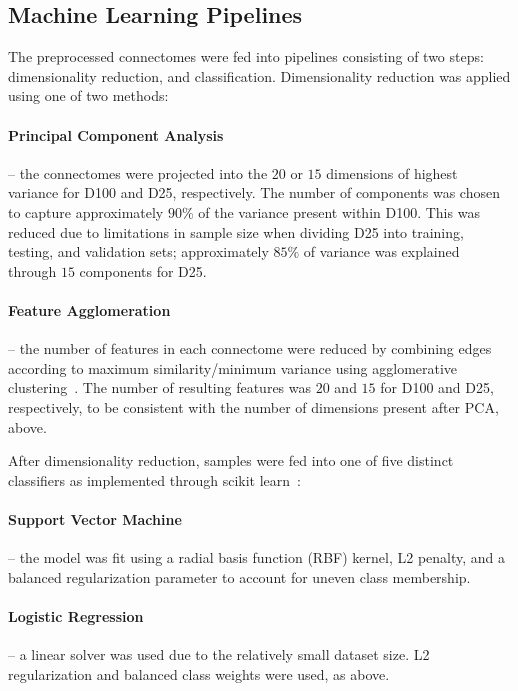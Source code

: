 \documentclass[10pt]{SelfArx} %
\begin{document}
\subsection*{Machine Learning Pipelines}

The preprocessed connectomes were fed into pipelines consisting of two steps: dimensionality reduction, and
classification. Dimensionality reduction was applied using one of two methods:

\paragraph{Principal Component Analysis} – the connectomes were projected into the $20$ or $15$ dimensions of highest
variance for D100 and D25, respectively. The number of components was chosen to capture approximately $90\%$ of the
variance present within D100. This was reduced due to limitations in sample size when dividing D25 into training,
testing, and validation sets; approximately $85\%$ of variance was explained through $15$ components for D25.

\paragraph{Feature Agglomeration} – the number of features in each connectome were reduced by combining edges according
to maximum similarity/minimum variance using agglomerative clustering~\cite{Ward1963-uh}. The number of resulting
features was $20$ and $15$ for D100 and D25, respectively, to be consistent with the number of dimensions present after
PCA, above.

After dimensionality reduction, samples were fed into one of five distinct classifiers as implemented through scikit
learn~\cite{Pedregosa2011-uz}:

\paragraph{Support Vector Machine} – the model was fit using a radial basis function (RBF) kernel, L2 penalty, and a
balanced regularization parameter to account for uneven class membership.

\paragraph{Logistic Regression} – a linear solver was used due to the relatively small dataset size. L2 regularization
and balanced class weights were used, as above.
\end{document}
